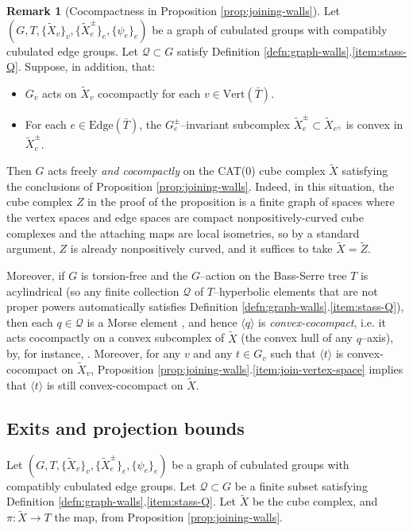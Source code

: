\documentclass[11pt,oneside]{amsart}
\newcounter{ax}
\theoremstyle{definition}
\newtheorem{rem}[thm]{Remark}
\newcommand{\vertices}{\mathrm{Vert}}
\newcommand{\edges}{\mathrm{Edge}}
\begin{document}
\begin{rem}[Cocompactness in Proposition \ref{prop:joining-walls}]\label{rem:splice-cocompact}
Let $(G,T,\{\widetilde X_v\}_v,\{\widetilde X_e^{\pm}\}_e,\{\psi_e\}_e)$ be a graph of cubulated groups with compatibly cubulated edge groups.  Let $\mathcal Q\subset G$ satisfy Definition \ref{defn:graph-walls}.\eqref{item:stass-Q}.  Suppose, in addition, that:
\begin{itemize}
    \item $G_v$ acts on $\widetilde X_v$ cocompactly for each $v\in\vertices(\bar T)$.
    \item For each $e\in\edges(\bar T)$, the $G_e^\pm$--invariant subcomplex $\widetilde X_e^\pm\subset \widetilde X_{e^\pm}$ is convex in $\widetilde X_e^{\pm}$.
\end{itemize}
Then $G$ acts freely \emph{and cocompactly} on the CAT(0) cube complex $\widetilde X$ satisfying the conclusions of Proposition \ref{prop:joining-walls}.  Indeed, in this situation, the cube complex $Z$ in the proof of the proposition is a finite graph of spaces where the vertex spaces and edge spaces are compact nonpositively-curved cube complexes and the attaching maps are local isometries, so by a standard argument, $Z$ is already nonpositively curved, and it suffices to take $\widetilde X=\widetilde Z$.

Moreover, if $G$ is torsion-free and the $G$--action on the Bass-Serre tree $T$ is acylindrical (so any finite collection $\mathcal Q$ of $T$--hyperbolic elements that are not proper powers automatically satisfies Definition \ref{defn:graph-walls}.\eqref{item:stass-Q}), then each $q\in\mathcal Q$ is a Morse element \cite[Thm. 1]{Sisto:morse}, and hence $\langle q\rangle$ is \emph{convex-cocompact}, i.e. it acts cocompactly on a convex subcomplex of $\widetilde X$ (the convex hull of any $q$--axis), by, for instance, \cite[Lem. 4.8]{Hagen:tuples}.  Moreover, for any $v$ and any $t\in G_v$ such that $\langle t\rangle$ is convex-cocompact on $\widetilde X_v$, Proposition \ref{prop:joining-walls}.\eqref{item:join-vertex-space} implies that $\langle t\rangle$ is still convex-cocompact on $\widetilde X$.  
\end{rem}

\subsection{Exits and projection bounds}\label{subsec:exits}
Let $(G,T,\{\widetilde X_v\}_v,\{\widetilde X_e^{\pm}\}_e,\{\psi_e\}_e)$ be a graph of cubulated groups with compatibly cubulated edge groups.  Let $\mathcal Q\subset G$ be a finite subset satisfying Definition \ref{defn:graph-walls}.\eqref{item:stass-Q}. Let $\widetilde X$ be the cube complex, and $\pi:\widetilde X\to T$ the map, from Proposition \ref{prop:joining-walls}.
\end{document}
